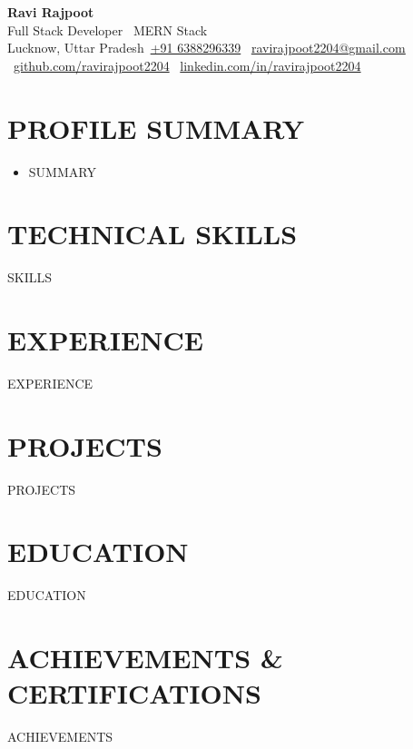 \documentclass[letterpaper,11pt]{article}
\newcommand{\resumeItem}[1]{\item\small{#1 \vspace{-2pt}}}
\newcommand{\resumeSubHeadingListStart}{\begin{itemize}[leftmargin=0.0in, label={}]}
\newcommand{\resumeSubHeadingListEnd}{\end{itemize}}
\newcommand{\resumeItemListStart}{\begin{itemize}[leftmargin=0.15in, label={$\bullet$}]}
\newcommand{\resumeItemListEnd}{\end{itemize}\vspace{-4pt}}
\begin{document}
\begin{center}
    {\Huge \bfseries Ravi Rajpoot} \\ \vspace{2pt}
    {\large Full Stack Developer \textbar\ MERN Stack} \\ \vspace{4pt}
    \small 
    Lucknow, Uttar Pradesh\textbar\ 
    \href{tel:+916388296339}{+91 6388296339} \textbar\ 
 \href{mailto:ravirajpoot2204@gmail.com}{\underline{ravirajpoot2204@gmail.com}} \textbar\
    \href{https://github.com/ravirajpoot2204}{github.com/ravirajpoot2204} \textbar\ 
    \href{https://www.linkedin.com/in/ravirajpoot2204/}{linkedin.com/in/ravirajpoot2204}
\end{center}

\section{PROFILE SUMMARY}
\resumeSubHeadingListStart
  \resumeItem{ {{SUMMARY}} }
\resumeSubHeadingListEnd

\section{TECHNICAL SKILLS}
\begin{itemize}[leftmargin=0.15in, label={}]
    \small{\item{
{{SKILLS}}
    }}
\end{itemize}

\section{EXPERIENCE}
\resumeSubHeadingListStart
{{EXPERIENCE}}
\resumeSubHeadingListEnd

\section{PROJECTS}
\resumeSubHeadingListStart
{{PROJECTS}}
\resumeSubHeadingListEnd

\section{EDUCATION}
\resumeSubHeadingListStart
{{EDUCATION}}
\resumeSubHeadingListEnd

\section{ACHIEVEMENTS \& CERTIFICATIONS}
\resumeItemListStart
{{ACHIEVEMENTS}}
\resumeItemListEnd
\end{document}

